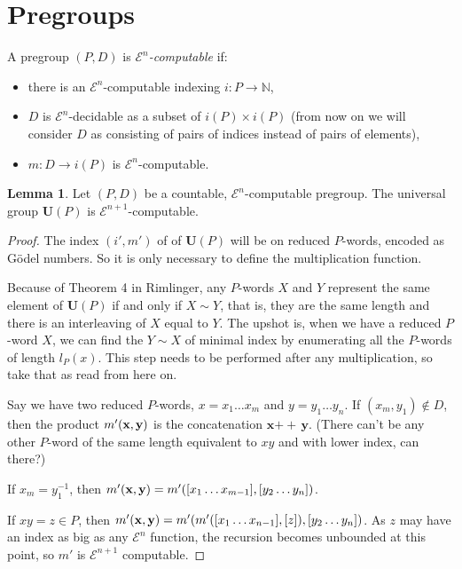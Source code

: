\documentclass[a4paper]{article}
\newcommand{\grz}[1]{$\mathcal{E}^{#1}$}	%
\newcommand{\NN}{\mathbb{N}}	%
\newcommand{\xvec}{\mathbf{x}}	%
\newcommand{\yvec}{\mathbf{y}}	%
\newcommand{\concat}{\ensuremath{+\!\!\!\!+\,}}	%
\newcommand{\ugroup}{\mathbf{U}(P)}														%
\theoremstyle{plain}
\theoremstyle{definition}
\newtheorem{lemma}[theorem]{Lemma}
\begin{document}
\section{Pregroups \label{pregroups}}

A pregroup $(P,D)$ is {\it \grz{n}-computable} if: 
\begin{itemize}
	\item there is an \grz{n}-computable indexing $i: P \rightarrow \NN$,
	\item  $D$ is \grz{n}-decidable as a subset of $i(P) \times i(P)$ (from now on we will consider $D$ as consisting of pairs of indices instead of pairs of elements),
	\item $m: D \rightarrow i(P)$ is \grz{n}-computable.
\end{itemize}

\begin{lemma} Let $(P,D)$ be a countable, \grz{n}-computable pregroup. The universal group $\ugroup$ is \grz{n+1}-computable.
\end{lemma}

\begin{proof}
The index $(i',m')$ of of $\ugroup$ will be on reduced $P$-words, encoded as G\"odel numbers. So it is only necessary to define the multiplication function.

Because of Theorem 4 in Rimlinger, any $P$-words $X$ and $Y$ represent the same element of $\ugroup$ if and only if $X \sim Y$, that is, they are the same length and there is an interleaving of $X$ equal to $Y$. The upshot is, when we have a reduced $P$-word $X$, we can find the $Y \sim X$ of minimal index by enumerating all the $P$-words of length $l_P(x)$. This step needs to be performed after any multiplication, so take that as read from here on.

Say we have two reduced $P$-words, $x = x_1 \dots x_m$ and $y = y_1 \dots y_n$. If $(x_m,y_1) \notin D$, then the product $m'({\bf x},{\bf y})$ is the concatenation $\xvec \concat \yvec$. (There can't be any other $P$-word of the same length equivalent to $xy$ and with lower index, can there?)

If $x_m = y_1^{-1}$, then $m'({\bf x},{\bf y}) = m'([x_1 \dots x_{m-1}],[y_2 \dots y_n])$.

If $xy = z \in P$, then $m'({\bf x},{\bf y}) = m'( m'([x_1 \dots x_{n-1}], [z]), [y_2 \dots y_n])$. As $z$ may have an index as big as any \grz{n} function, the recursion becomes unbounded at this point, so $m'$ is \grz{n+1} computable.
\end{proof}



\end{document}
